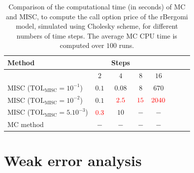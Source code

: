 \documentclass[11pt]{article}
\begin{document}
\begin{table}[htbp]
	\centering
	\begin{tabular}{l*{6}{c}r}
		\toprule[1.5pt]
	Method & & Steps  & &     \\
	\hline
	        & $2$ & $4$ & $8$  &$16$  \\
		\hline
		MISC ($\text{TOL}_{\text{MISC}}=10^{-1}$)  & $0.1$ & $0.08$ & $8$  & $670$ \\
		MISC ($\text{TOL}_{\text{MISC}}=10^{-2}$)  & $0.1$ & ${\color{red}2.5}$ & ${\color{red}15}$ &  ${\color{red}2040}$\\
				MISC ($\text{TOL}_{\text{MISC}}=5.10^{-3}$)  & ${\color{red}0.3}$& $10$ & $-$ &  $-$\\
		\hline	
		MC method & $-$  & $-$  & $-$ & $-$ \\
		\bottomrule[1.25pt]	
		\hline
	\end{tabular}
	\caption{Comparison of the computational time (in seconds) of  MC and MISC, to compute the call option price of the rBergomi model, simulated using Cholesky scheme, for different numbers of time steps. The average MC CPU time is computed over $100$ runs.}
	\label{Comparsion of the computational time of  MC and MISC, used to compute Call option price of rBergomi model_cholesky for different number of time steps. Case $K=1, H=0.07$, linear}
\end{table}
\FloatBarrier
\section{Weak error analysis}\label{sec:Weak error analysis}




 







 

 

 
 
 
\end{document}
